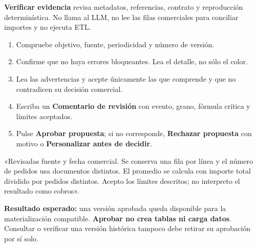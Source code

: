 \textbf{Verificar evidencia} revisa metadatos, referencias, contrato y reproducción determinística. No llama al LLM, no lee las filas comerciales para conciliar importes y no ejecuta ETL.
\begin{enumerate}
\item Compruebe objetivo, fuente, periodicidad y número de versión.
\item Confirme que no haya errores bloqueantes. Lea el detalle, no sólo el color.
\item Lea las advertencias y acepte únicamente las que comprende y que no contradicen su decisión comercial.
\item Escriba un \textbf{Comentario de revisión} con evento, grano, fórmula crítica y límites aceptados.
\item Pulse \textbf{Aprobar propuesta}; si no corresponde, \textbf{Rechazar propuesta} con motivo o \textbf{Personalizar antes de decidir}.
\end{enumerate}
\begin{good}
«Revisadas fuente y fecha comercial. Se conserva una fila por línea y el número de pedidos usa documentos distintos. El promedio se calcula con importe total dividido por pedidos distintos. Acepto los límites descritos; no interpreto el resultado como cobros».
\end{good}
\textbf{Resultado esperado:} una versión aprobada queda disponible para la materialización compatible. \textbf{Aprobar no crea tablas ni carga datos}. Consultar o verificar una versión histórica tampoco debe retirar su aprobación por sí solo.


